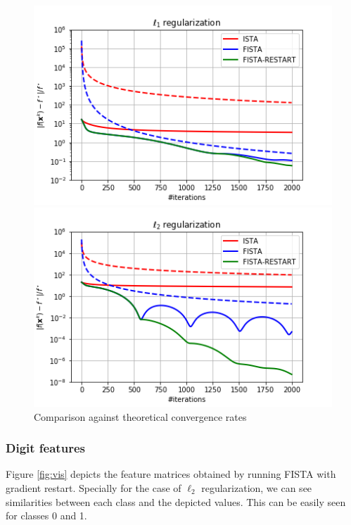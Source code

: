 \documentclass{article}
\begin{document}
\begin{figure}[H]
    \centering
    \begin{minipage}{.45\textwidth}
        \includegraphics[width=\textwidth]{img/l1_reg.png}
    \end{minipage}
    \begin{minipage}{.45\textwidth}
        \includegraphics[width=\textwidth]{img/l2_reg.png}
    \end{minipage}
    \caption{Comparison against theoretical convergence rates}
    \label{fig:theo}
\end{figure}

\subsubsection*{Digit features}
Figure \ref{fig:vis} depicts the feature matrices obtained by running FISTA with gradient restart. Specially for the case of $\ell_2$ regularization, we can see similarities between each class and the depicted values. This can be easily seen for classes 0 and 1.
\end{document}
